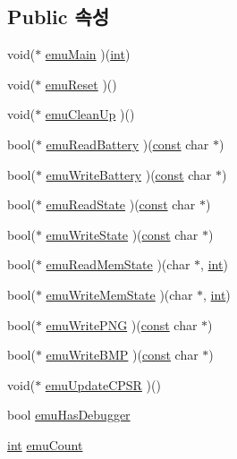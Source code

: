 \subsection*{Public 속성}
\begin{DoxyCompactItemize}
\item 
void($\ast$ \mbox{\hyperlink{struct_emulated_system_a7ff4d7f593baf3463709ea72a6c4a20b}{emu\+Main}} )(\mbox{\hyperlink{_util_8cpp_a0ef32aa8672df19503a49fab2d0c8071}{int}})
\item 
void($\ast$ \mbox{\hyperlink{struct_emulated_system_ae79a9b5e75ec8b74ededbbaceac2d630}{emu\+Reset}} )()
\item 
void($\ast$ \mbox{\hyperlink{struct_emulated_system_ad85b1185af3fdc35c666eb4d0eb1a431}{emu\+Clean\+Up}} )()
\item 
bool($\ast$ \mbox{\hyperlink{struct_emulated_system_a8cf069af2706aff38ac0ec1f5ae91a69}{emu\+Read\+Battery}} )(\mbox{\hyperlink{getopt1_8c_a2c212835823e3c54a8ab6d95c652660e}{const}} char $\ast$)
\item 
bool($\ast$ \mbox{\hyperlink{struct_emulated_system_a95f2eb865a1b7866d8eeeb802d36434c}{emu\+Write\+Battery}} )(\mbox{\hyperlink{getopt1_8c_a2c212835823e3c54a8ab6d95c652660e}{const}} char $\ast$)
\item 
bool($\ast$ \mbox{\hyperlink{struct_emulated_system_a1ad8780083ad23c2cbe474fc570745ea}{emu\+Read\+State}} )(\mbox{\hyperlink{getopt1_8c_a2c212835823e3c54a8ab6d95c652660e}{const}} char $\ast$)
\item 
bool($\ast$ \mbox{\hyperlink{struct_emulated_system_a649c6ceaabee941f263a32fa8a73a9c5}{emu\+Write\+State}} )(\mbox{\hyperlink{getopt1_8c_a2c212835823e3c54a8ab6d95c652660e}{const}} char $\ast$)
\item 
bool($\ast$ \mbox{\hyperlink{struct_emulated_system_aeb808d20d5ba0fe3ffa5ec59c798105f}{emu\+Read\+Mem\+State}} )(char $\ast$, \mbox{\hyperlink{_util_8cpp_a0ef32aa8672df19503a49fab2d0c8071}{int}})
\item 
bool($\ast$ \mbox{\hyperlink{struct_emulated_system_a91e29689742db5aa32a73c2f5698605a}{emu\+Write\+Mem\+State}} )(char $\ast$, \mbox{\hyperlink{_util_8cpp_a0ef32aa8672df19503a49fab2d0c8071}{int}})
\item 
bool($\ast$ \mbox{\hyperlink{struct_emulated_system_a741364ed335ac65cc30c6749896274bc}{emu\+Write\+P\+NG}} )(\mbox{\hyperlink{getopt1_8c_a2c212835823e3c54a8ab6d95c652660e}{const}} char $\ast$)
\item 
bool($\ast$ \mbox{\hyperlink{struct_emulated_system_a3196ed548c01811a8c482294d68ec56b}{emu\+Write\+B\+MP}} )(\mbox{\hyperlink{getopt1_8c_a2c212835823e3c54a8ab6d95c652660e}{const}} char $\ast$)
\item 
void($\ast$ \mbox{\hyperlink{struct_emulated_system_a68f7f4e7c67eede19c75eb85ebe805c2}{emu\+Update\+C\+P\+SR}} )()
\item 
bool \mbox{\hyperlink{struct_emulated_system_a3c90818d1108c9f7370a388419344362}{emu\+Has\+Debugger}}
\item 
\mbox{\hyperlink{_util_8cpp_a0ef32aa8672df19503a49fab2d0c8071}{int}} \mbox{\hyperlink{struct_emulated_system_a4241c0057d935ae757508f26be9b37ad}{emu\+Count}}
\end{DoxyCompactItemize}


